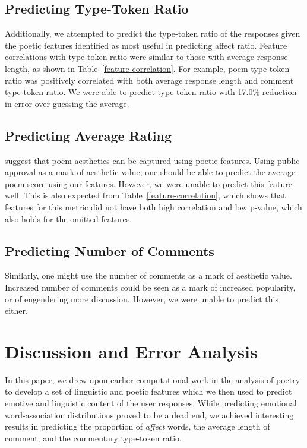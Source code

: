 \documentclass[11pt]{article}
\begin{document}
\subsection{Predicting Type-Token Ratio}
Additionally, we attempted to predict the type-token ratio of the responses given the poetic features identified as most useful in predicting affect ratio. Feature correlations with type-token ratio were similar to those with average response length, as shown in Table~\ref{feature-correlation}. For example, poem type-token ratio was positively correlated with both average response length and comment type-token ratio. We were able to predict type-token ratio with 17.0\% reduction in error over guessing the average.

\subsection{Predicting Average Rating}
 suggest that poem aesthetics can be captured using poetic features. Using public approval as a mark of aesthetic value, one should be able to predict the average poem score using our features. However, we were unable to predict this feature well. This is also expected from Table~\ref{feature-correlation}, which shows that features for this metric did not have both high correlation and low p-value, which also holds for the omitted features.

\subsection{Predicting Number of Comments}
Similarly, one might use the number of comments as a mark of aesthetic value. Increased number of comments could be seen as a mark of increased popularity, or of engendering more discussion. However, we were unable to predict this either.

\section{Discussion and Error Analysis}
In this paper, we drew upon earlier computational work in the analysis of poetry to develop a set of linguistic and poetic features which we then used to predict emotive and linguistic content of the user responses. While predicting emotional word-association distributions proved to be a dead end, we achieved interesting results in predicting the proportion of \emph{affect} words, the average length of comment, and the commentary type-token ratio.
\end{document}
